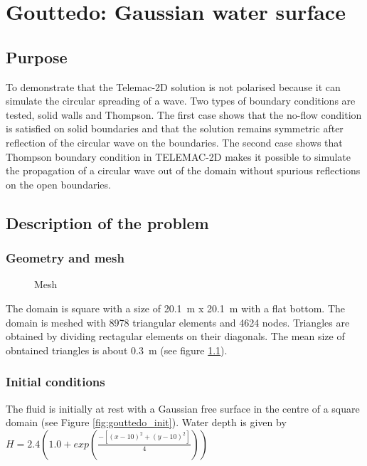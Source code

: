 
\chapter{Gouttedo: Gaussian water surface}
%
%
\section{Purpose}
%
To demonstrate that the Telemac-2D solution is not polarised because it can
simulate the circular spreading of a wave.
Two types of boundary conditions are tested, solid walls and Thompson.
The first case shows that the no-flow
condition is satisfied on solid boundaries and that the solution remains
symmetric after reflection of the circular wave on the boundaries.
The second case shows that Thompson boundary condition in TELEMAC-2D
makes it possible to simulate the propagation of a circular wave out of the domain
without spurious reflections on the open boundaries.

%
\section{Description of the problem}
%
\subsection{Geometry and mesh}

\begin{figure}[h]
\begin{center}
\end{center}
\caption{Mesh}
\label{fig:gouttedo_mesh}
\end{figure}

The domain is square with a size of  20.1~m x 20.1~m with a flat bottom.
The domain is meshed with 8978 triangular elements and 4624 nodes. Triangles
are obtained by dividing rectagular elements on their diagonals. The mean size
of obntained triangles is about 0.3~m (see figure \ref{fig:gouttedo_mesh}).

\subsection{Initial conditions}
The fluid is initially at rest with a Gaussian free surface in the centre of a
square domain (see Figure \ref{fig:gouttedo_init}). Water depth is given by
$ H= 2.4 \left(1.0+exp \left( \frac{-\left[ (x-10)^2+( y-10)^2\right]}{ 4}\right)\right) $

